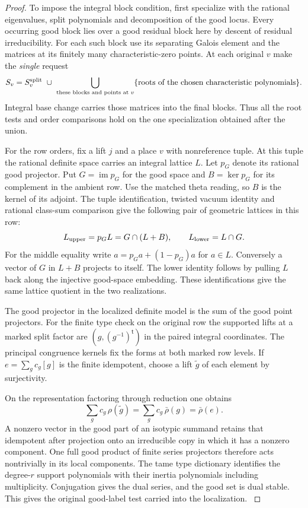 \begin{proof}
To impose the integral block condition, first specialize with the
rational eigenvalues, split polynomials and decomposition of the
good locus. Every occurring good block lies over a good residual
block here by descent of residual irreducibility. For each such
block use its separating Galois element and the matrices at its
finitely many characteristic-zero points. At each original \(v\)
make the \emph{single} request
\[
 S_v=S_v^{\rm split}\ \cup\
    \bigcup_{\text{these blocks and points at }v}
       \{\text{roots of the chosen characteristic polynomials}\}.
\]
Integral base change carries those matrices into the final blocks.
Thus all the root tests and order comparisons hold on the one
specialization obtained after the union. \label{cor:automorphic-realization-38}

For the row orders, fix a lift \(j\) and a place \(v\) with
nonreference tuple. At this tuple the rational definite space
carries an integral lattice \(L\). Let \(p_G\) denote its rational good projector.
Put \(G=\operatorname{im}p_G\) for the good space and \(B=\ker p_G\)
for its complement in the ambient row. Use the matched theta reading,
so \(B\) is the kernel of its adjoint. The tuple identification,
twisted vacuum identity and rational class-sum comparison give the
following pair of geometric lattices in this row:
\[
 L_{\rm upper}=p_G L=G\cap(L+B),\qquad L_{\rm lower}=L\cap G .
\]
For the middle equality write \(a=p_Ga+(1-p_G)a\) for \(a\in L\).
Conversely a vector of \(G\) in \(L+B\) projects to itself.
The lower identity follows by pulling \(L\) back along the injective
good-space embedding. These identifications give the same lattice
quotient in the two realizations. \label{cor:automorphic-realization-39}

The good projector in the localized definite model is the sum of
the good point projectors. For the finite type check on the
original row the supported lifts at a marked split factor are
\((g,(g^{-1})^{\mathsf t})\) in the paired integral coordinates.
The principal congruence kernels fix the forms at both marked
row levels. If \(e=\sum_g c_g[g]\) is the finite idempotent, choose a lift \(\tilde g\) of each element by surjectivity.

On the representation factoring through reduction one obtains
\[
 \sum_g c_g\,\rho(\tilde g)=\sum_g c_g\,\bar\rho(g)=\bar\rho(e).
\] A nonzero vector in the good part of an isotypic
summand retains that idempotent after projection onto an
irreducible copy in which it has a nonzero component. One full
good product of finite series projectors therefore acts
nontrivially in its local components. The tame type dictionary
identifies the degree-\(r\) support polynomials with their
inertia polynomials including multiplicity. Conjugation gives
the dual series, and the good set is dual stable. This gives
the original good-label test carried into the localization.
\label{cor:automorphic-realization-40}


\end{proof}
